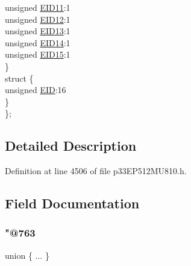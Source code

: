 \begin{DoxyCompactItemize}
\begin{tabbing}
\>\>unsigned \hyperlink{structtag_c1_r_x_f13_e_i_d_b_i_t_s_a710bdb0d602deb021b0be99066008018}{EID11}:1\\
\>\>unsigned \hyperlink{structtag_c1_r_x_f13_e_i_d_b_i_t_s_aa347bb85867bd8d4e0124f7cff8c6472}{EID12}:1\\
\>\>unsigned \hyperlink{structtag_c1_r_x_f13_e_i_d_b_i_t_s_a37d5f3edcbf6ef62f848fd4f3c584f79}{EID13}:1\\
\>\>unsigned \hyperlink{structtag_c1_r_x_f13_e_i_d_b_i_t_s_a7ffc0b0e0d99b8476b6f9a45337c17ab}{EID14}:1\\
\>\>unsigned \hyperlink{structtag_c1_r_x_f13_e_i_d_b_i_t_s_a293cd7dc1746257fa75a60cbd9383cd7}{EID15}:1\\
\>\} \\
\>struct \{\\
\>\>unsigned \hyperlink{structtag_c1_r_x_f13_e_i_d_b_i_t_s_ae80b378c9141f7c03e0b4e55b5f4b54d}{EID}:16\\
\>\} \\
\}; \\

\end{tabbing}\end{DoxyCompactItemize}


\subsection{Detailed Description}


Definition at line 4506 of file p33\+E\+P512\+M\+U810.\+h.



\subsection{Field Documentation}
\mbox{\label{structtag_c1_r_x_f13_e_i_d_b_i_t_s_a686820a1f1883541f3d80ad51ce5e6f6}} 
\subsubsection{\texorpdfstring{"@763}{@763}}
{\footnotesize\ttfamily union \{ ... \} }

\mbox{\label{structtag_c1_r_x_f13_e_i_d_b_i_t_s_ae80b378c9141f7c03e0b4e55b5f4b54d}} 
